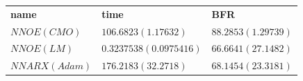 \begin{table}
	\centering
		\begin{tabular}{lll}
			\textbf{name} & \textbf{time} & \textbf{BFR}\\
			$NNOE (CMO)$ & $ 106.6823 (  1.17632)$ & $88.2853 (1.29739)$ \\
			$NNOE (LM)$ & $0.3237538 (0.0975416)$ & $66.6641 (27.1482)$ \\
			$NNARX (Adam)$ & $ 176.2183 (  32.2718)$ & $68.1454 (23.3181)$ 
		\end{tabular}
\end{table}